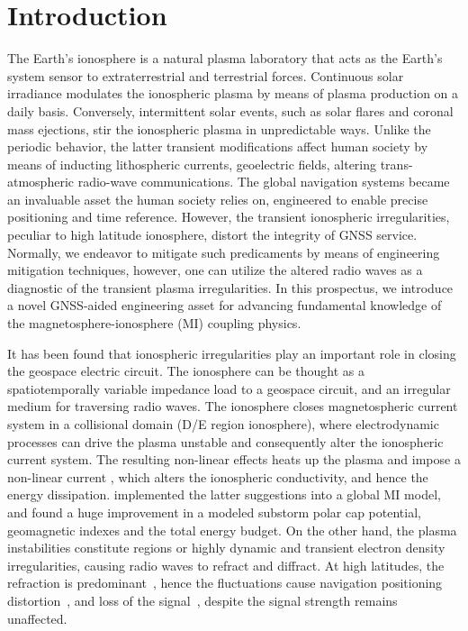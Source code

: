 \documentclass[letterpaper,12pt]{article}
\begin{document}
\section{Introduction}

The Earth's ionosphere is a natural plasma laboratory that acts as the Earth's system sensor to extraterrestrial and terrestrial forces. Continuous solar irradiance modulates the ionospheric plasma by means of plasma production on a daily basis. Conversely, intermittent solar events, such as solar flares and coronal mass ejections, stir the ionospheric plasma in unpredictable ways. Unlike the periodic behavior, the latter transient modifications affect human society by means of inducting lithospheric currents, geoelectric fields, altering trans-atmospheric radio-wave communications. The global navigation systems became an invaluable asset the human society relies on, engineered to enable precise positioning and time reference. However, the transient ionospheric irregularities, peculiar to high latitude ionosphere, distort the integrity of GNSS service. Normally, we endeavor to mitigate such predicaments by means of engineering mitigation techniques, however, one can utilize the altered radio waves as a diagnostic of the transient plasma irregularities. In this prospectus, we introduce a novel GNSS-aided engineering asset for advancing fundamental knowledge of the magnetosphere-ionosphere (MI) coupling physics.

It has been found that ionospheric irregularities play an important role in closing the geospace electric circuit. The ionosphere can be thought as a spatiotemporally variable impedance load to a geospace circuit, and an irregular medium for traversing radio waves. The ionosphere closes magnetospheric current system in a collisional domain (D/E region ionosphere), where electrodynamic processes can drive the plasma unstable and consequently alter the ionospheric current system. The resulting non-linear effects heats up the plasma \citep{Dimant2003} and impose a non-linear current \citep{Dimant2011a, Dimant2011b}, which alters the ionospheric conductivity, and hence the energy dissipation. \citet{Wiltberger2017} implemented the latter suggestions into a global MI model, and found a huge improvement in a modeled substorm polar cap potential, geomagnetic indexes and the total energy budget. On the other hand, the plasma instabilities constitute regions or highly dynamic and transient electron density irregularities, causing radio waves to refract and diffract. At high latitudes, the refraction is predominant~\citep{Spogli2009, Jiao2013}, hence the fluctuations cause navigation positioning distortion~\citep{Jacobsen2016}, and loss of the signal~\citep{Semeter2017}, despite the signal strength remains unaffected.
\end{document}
